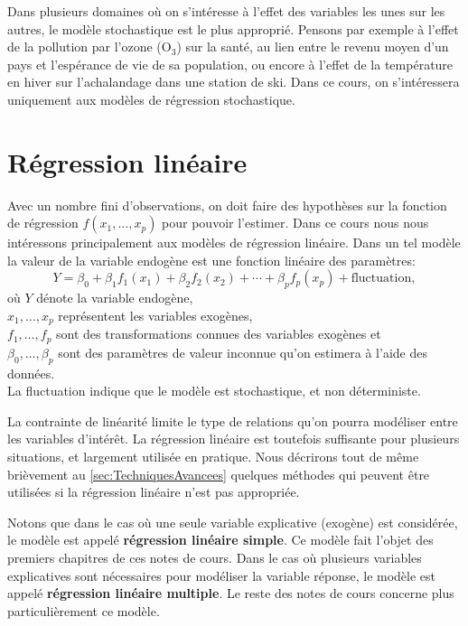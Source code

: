 Dans plusieurs domaines où on s'intéresse à l'effet des variables les unes sur les autres, le modèle stochastique est le plus approprié. Pensons par exemple à l'effet de la pollution par l'ozone (O$_3$) sur la santé, au lien entre le revenu moyen d'un pays et l'espérance de vie de sa population, ou encore à l'effet de la température en hiver sur l'achalandage dans une station de ski. Dans ce cours, on s'intéressera uniquement aux modèles de régression stochastique.



\section{Régression linéaire}


Avec un nombre fini d'observations, on doit faire des hypothèses sur la fonction de régression $f(x_1,\ldots,x_p)$ pour pouvoir l'estimer. Dans ce cours nous nous intéressons principalement aux modèles de régression linéaire.
Dans un tel modèle la valeur de la variable endogène est une fonction linéaire des paramètres:
\begin{equation}\label{eq:regresslin}
Y=\beta_0+\beta_1f_1(x_1)+\beta_2f_2(x_2)+\cdots+\beta_pf_p(x_p)+
\mbox{fluctuation},
\end{equation}
où $Y$ dénote la variable endogène, \\ $x_1,\ldots,x_p$ représentent les variables
exogènes, \\ $f_1,\ldots,f_{p}$ sont des transformations connues des variables
exogènes et \\
$\beta_0,\ldots,\beta_p$ sont des paramètres de valeur
inconnue qu'on estimera à l'aide des données.\\
La fluctuation indique que le modèle est stochastique, et non déterministe.

La contrainte de linéarité limite le type de relations qu'on pourra modéliser entre les variables d'intérêt. La régression linéaire est toutefois suffisante pour plusieurs situations, et largement utilisée en pratique. Nous décrirons tout de même brièvement au  \autoref{sec:TechniquesAvancees}  quelques méthodes qui peuvent être utilisées si la régression linéaire n'est pas appropriée.

Notons que dans le cas où une seule variable explicative (exogène) est considérée, le modèle est appelé \textbf{régression linéaire simple}. Ce modèle fait
l'objet des premiers chapitres de ces notes de cours. Dans le cas où plusieurs variables explicatives sont nécessaires pour modéliser la variable réponse, le modèle est appelé \textbf{régression linéaire multiple}. Le reste des notes de cours concerne plus particulièrement ce modèle.

